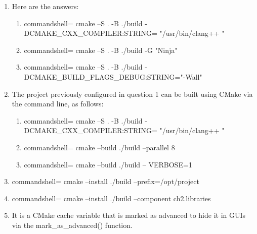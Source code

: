 

\begin{enumerate}
\item 
Here are the answers:
\begin{enumerate}[label=\Alph*]
\item 

\begin{tcblisting}{commandshell={}}
cmake –S . -B ./build -DCMAKE_CXX_COMPILER:STRING=
"/usr/bin/clang++ "
\end{tcblisting}

\item

\begin{tcblisting}{commandshell={}}
cmake –S . -B ./build -G "Ninja"
\end{tcblisting}

\item 

\begin{tcblisting}{commandshell={}}
cmake –S . -B ./build 
-DCMAKE_BUILD_FLAGS_DEBUG:STRING="-Wall"
\end{tcblisting}
\end{enumerate}

\item 
The project previously configured in question 1 can be built using CMake via the
command line, as follows:

\begin{enumerate}[label=\Alph*]
\item 
\begin{tcblisting}{commandshell={}}
cmake –S . -B ./build 
-DCMAKE_CXX_COMPILER:STRING= "/usr/bin/clang++ "
\end{tcblisting}

\item

\begin{tcblisting}{commandshell={}}
cmake --build ./build --parallel 8
\end{tcblisting}

\item 

\begin{tcblisting}{commandshell={}}
cmake --build ./build -- VERBOSE=1
\end{tcblisting}
\end{enumerate}

\item 
\begin{tcblisting}{commandshell={}}
cmake --install ./build --prefix=/opt/project
\end{tcblisting}

\item 
\begin{tcblisting}{commandshell={}}
cmake --install ./build --component ch2.libraries
\end{tcblisting}

\item 
It is a CMake cache variable that is marked as advanced to hide it in GUIs via the mark\_as\_advanced() function.
\end{enumerate}